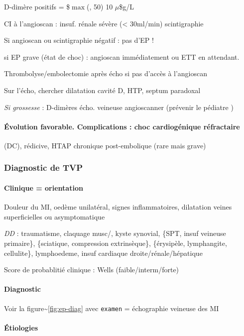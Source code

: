 \documentclass[11pt]{article}
\begin{document}
D-dimère positifs = \$\(\max\)(, 50) \texttimes{} 10 \(\mu\)\$g/L

CI à l'angioscan : insuf. rénale sévère (< 30ml/min) \thus scintigraphie

Si angioscan ou scintigraphie négatif : pas d'EP !

\begin{tcolorbox}
\danger{} si EP grave (état de choc) : angioscan immédiatement ou ETT en
attendant.

\faBomb{} Thrombolyse/embolectomie après écho si pas d'accès à l'angioscan
\end{tcolorbox}

Sur l'écho, chercher dilatation cavité D, HTP, septum paradoxal

\emph{Si grossesse}  : D-dimères \thus écho. veineuse \thus angioscanner
(prévenir le pédiatre \faBomb)

\paragraph{Évolution favorable. Complications : choc cardiogénique réfractaire}
\label{sec:org73b0ae5}
(DC), rédicive, HTAP chronique post-embolique (rare mais grave)

\subsubsection{Diagnostic de TVP}
\label{sec:orge988847}
\paragraph{Clinique = orientation}
\label{sec:org6cc0a6a}
Douleur du MI, oedème unilatéral, signes inflammatoires, dilatation veines
superficielles ou asymptomatique

\emph{DD}  : traumatisme, claquage musc/, kyste synovial, \{SPT, insuf veineuse
primaire\}, \{sciatique, compression extrinsèque\}, \{érysipèle, lymphangite,
cellulite\}, lymphoedeme, insuf cardiaque droite/rénale/hépatique

Score de probablitié clinique : Wells (faible/interm/forte)

\paragraph{Diagnostic}
\label{sec:orgda9097a}
Voir la figure\textasciitilde{}\ref{fig:ep-diag} avec \texttt{examen} = échographie veineuse
des MI

\paragraph{Étiologies}
\label{sec:org9c5838e}
\end{document}
